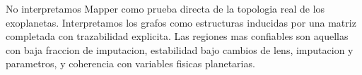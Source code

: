 No interpretamos Mapper como prueba directa de la topologia real de los exoplanetas. Interpretamos los grafos como estructuras inducidas por una matriz completada con trazabilidad explicita. Las regiones mas confiables son aquellas con baja fraccion de imputacion, estabilidad bajo cambios de lens, imputacion y parametros, y coherencia con variables fisicas planetarias.

